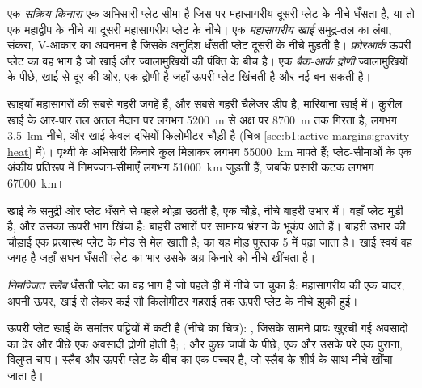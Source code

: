 \begin{definition}[सक्रिय किनारा, महासागरीय खाई, फ़ोरआर्क, बैक-आर्क द्रोणी]\label{def:b1:active-margins:active-margin}
एक \emph{सक्रिय किनारा} एक अभिसारी प्लेट-सीमा है जिस पर महासागरीय  दूसरी प्लेट के नीचे धँसता है, या तो एक महाद्वीप के नीचे या दूसरी महासागरीय प्लेट के नीचे। एक \emph{महासागरीय खाई} समुद्र-तल का लंबा, संकरा, V-आकार का अवनमन है जिसके अनुदिश धँसती प्लेट दूसरी के नीचे मुड़ती है। \emph{फ़ोरआर्क} ऊपरी प्लेट का वह भाग है जो खाई और ज्वालामुखियों की पंक्ति के बीच है। एक \emph{बैक-आर्क द्रोणी} ज्वालामुखियों के पीछे, खाई से दूर की ओर, एक द्रोणी है जहाँ ऊपरी प्लेट खिंचती है और नई  बन सकती है।
\end{definition}

खाइयाँ महासागरों की सबसे गहरी जगहें हैं, और सबसे गहरी चैलेंजर डीप है, मारियाना खाई में। कुरील खाई के आर-पार तल अतल मैदान पर लगभग \qty{5200}{m} से अक्ष पर \qty{8700}{m} तक गिरता है, लगभग \qty{3.5}{km} नीचे, और खाई केवल दसियों किलोमीटर चौड़ी है (चित्र \cref{sec:b1:active-margins:gravity-heat} में)। पृथ्वी के अभिसारी किनारे कुल मिलाकर लगभग \qty{55000}{km} मापते हैं; प्लेट-सीमाओं के एक अंकीय प्रतिरूप में निमज्जन-सीमाएँ लगभग \qty{51000}{km} जुड़ती हैं, जबकि प्रसारी कटक लगभग \qty{67000}{km}।

खाई के समुद्री ओर प्लेट धँसने से पहले थोड़ा उठती है, एक चौड़े, नीचे बाहरी उभार में। वहाँ प्लेट मुड़ी है, और उसका ऊपरी भाग खिंचा है: बाहरी उभारों पर सामान्य भ्रंशन के भूकंप आते हैं। बाहरी उभार की चौड़ाई एक प्रत्यास्थ प्लेट के मोड़ से मेल खाती है;  का यह मोड़ पुस्तक 5 में पढ़ा जाता है। खाई स्वयं वह जगह है जहाँ सघन धँसती प्लेट का भार उसके अग्र किनारे को नीचे खींचता है।

\begin{definition}[निमज्जित स्लैब]\label{def:b1:active-margins:slab}
\emph{निमज्जित स्लैब} धँसती प्लेट का वह भाग है जो पहले ही  में नीचे जा चुका है: महासागरीय  की एक चादर, अपनी  ऊपर, खाई से लेकर कई सौ किलोमीटर गहराई तक ऊपरी प्लेट के नीचे झुकी हुई।
\end{definition}

ऊपरी प्लेट खाई के समांतर पट्टियों में कटी है (नीचे का चित्र): , जिसके सामने प्रायः खुरची गई अवसादों का ढेर और पीछे एक अवसादी द्रोणी होती है; ; और कुछ चापों के पीछे, एक  और उसके परे एक पुराना, विलुप्त चाप। स्लैब और ऊपरी प्लेट के बीच  का एक पच्चर है, जो स्लैब के शीर्ष के साथ नीचे खींचा जाता है।

